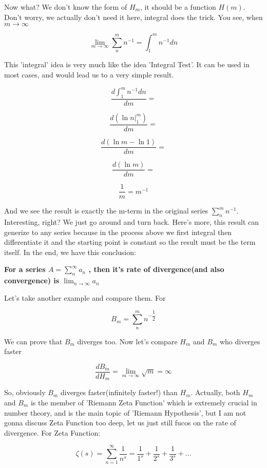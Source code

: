 \documentclass{article}
\begin{document}
  Now what? We don't know the form of $H_m$, it should be a function $H(m)$. Don't worry, we actually don't need it here, integral does the trick. You see, when $m \to \infty$

  \[
	  \lim_{m \to \infty} \sum_{n}^{m} n^{-1} = \int_{1}^{m} n^{-1} dn
  \]

  This 'integral' idea is very much like the idea 'Integral Test'. It can be used in most cases, and would lead us to a very simple result.

  \[
	  \dfrac{d \displaystyle \int_{1}^{m} n^{-1} dn}{dm} = 
  \]

  \[
	  \dfrac{d \left( \ln n |_{1}^{m} \right)}{dm} = 
  \]

  \[
	  \dfrac{d (\ln m - \ln 1)}{dm} = 
  \]

  \[
	  \dfrac{d (\ln m)}{dm} = 
  \]

  \[
	  \dfrac{1}{m} = m^{-1}
  \]

  And we see the result is exactly the m-term in the original series $\displaystyle \sum_{n}^{m} n^{-1}$. Interesting, right? We just go around and turn back. Here's more, this result can generize to any series because in the process above we first integral then differentiate it and the starting point is constant so the result must be the term itself. In the end, we have this conclusion:

  \begin{center}
	  \textbf{For a series $A = \displaystyle \sum_{n}^{\infty} a_n$ , then it's rate of divergence(and also convergence) is $\displaystyle \lim_{n \to \infty} a_n$}
  \end{center}

  Let's take another example and compare them. For 

  \[
	  B_m = \displaystyle \sum_{n}^{m} n^{- \dfrac{1}{2}}  
  \]

  We can prove that $B_m$ diverges too. Now let's compare $H_m$ and $B_m$ who diverges faster

  \[
	  \dfrac{dB_m}{dH_m} = \displaystyle \lim_{m \to \infty} \sqrt{m} = \infty
  \]

  So, obviously $B_m$ diverges faster(infinitely faster!) than $H_m$. Actually, both $H_m$ and $B_m$ is the member of 'Riemann Zeta Function' which is extremely crucial in number theory, and is the main topic of 'Riemann Hypothesis', but I am not gonna discuss Zeta Function too deep, let us just still fucos on the rate of divergence. For Zeta Function:

  \[
	  \zeta(s) = \displaystyle \sum_{n=1}^{\infty} \dfrac{1}{n^s} = \dfrac{1}{1^s} + \dfrac{1}{2^s} + \dfrac{1}{3^s} + ...
  \]
\end{document}
